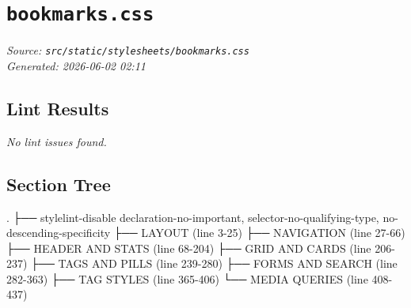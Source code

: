 
\section{\texttt{bookmarks.css}}
\textit{Source: \texttt{src/static/stylesheets/bookmarks.css}} \\
\textit{Generated: 2026-06-02 02:11} \\

\subsection{Lint Results}
\textit{No lint issues found.} \\

\subsection{Section Tree}
\begingroup
\linespread{0.9}\selectfont
\begin{verbnobox}[\FiraCode]
.
├── stylelint-disable declaration-no-important, selector-no-qualifying-type, no-descending-specificity
├── LAYOUT  (line 3-25)
├── NAVIGATION  (line 27-66)
├── HEADER AND STATS  (line 68-204)
├── GRID AND CARDS  (line 206-237)
├── TAGS AND PILLS  (line 239-280)
├── FORMS AND SEARCH  (line 282-363)
├── TAG STYLES  (line 365-406)
└── MEDIA QUERIES  (line 408-437)
\end{verbnobox}
\endgroup
